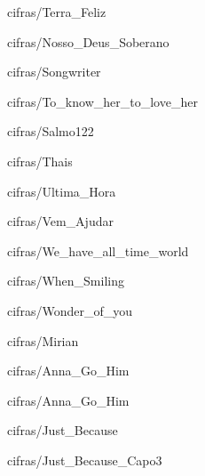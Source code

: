 \documentclass{scrartcl}
\begin{document}

{cifras/Terra_Feliz}


{cifras/Nosso_Deus_Soberano}


{cifras/Songwriter}


{cifras/To_know_her_to_love_her}


{cifras/Salmo122}


{cifras/Thais}


{cifras/Ultima_Hora}


{cifras/Vem_Ajudar}


{cifras/We_have_all_time_world}


{cifras/When_Smiling}


{cifras/Wonder_of_you}


{cifras/Mirian}


{cifras/Anna_Go_Him}


{cifras/Anna_Go_Him}


{cifras/Just_Because}


{cifras/Just_Because_Capo3}
\end{document}

